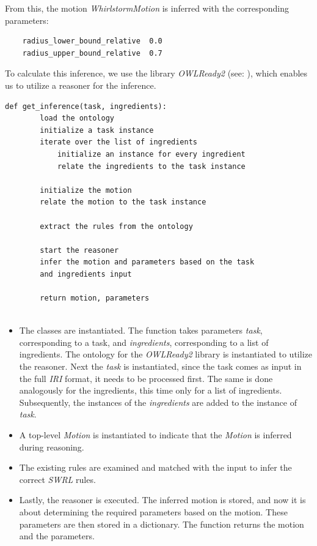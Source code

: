 From this, the motion \textit{WhirlstormMotion} is inferred with the corresponding parameters:
\begin{lstlisting}
    radius_lower_bound_relative  0.0
    radius_upper_bound_relative  0.7
\end{lstlisting}
To calculate this inference, we use the library \textit{OWLReady2} (see: ), which enables us to utilize a reasoner for the inference.

\begin{lstlisting}[caption={Inference},captionpos=b]
    def get_inference(task, ingredients):
        load the ontology
        initialize a task instance
        iterate over the list of ingredients
            initialize an instance for every ingredient
            relate the ingredients to the task instance
        
        initialize the motion
        relate the motion to the task instance

        extract the rules from the ontology

        start the reasoner
        infer the motion and parameters based on the task 
        and ingredients input

        return motion, parameters


\end{lstlisting}
\begin{itemize}
    \item The classes are instantiated. The function takes parameters \textit{task}, corresponding to a task, and \textit{ingredients}, corresponding to a list of ingredients. The ontology for the \textit{OWLReady2} library is instantiated to utilize the reasoner. Next the \textit{task} is instantiated, since the task comes as input in the full \textit{IRI} format, it needs to be processed first. The same is done analogously for the ingredients, this time only for a list of ingredients. Subsequently, the instances of the \textit{ingredients} are added to the instance of \textit{task}.
    \item A top-level \textit{Motion} is instantiated to indicate that the \textit{Motion} is inferred during reasoning.
    \item The existing rules are examined and matched with the input to infer the correct \textit{SWRL} rules.
    \item Lastly, the reasoner is executed. The inferred motion is stored, and now it is about determining the required parameters based on the motion. These parameters are then stored in a dictionary. The function returns the motion and the parameters.
\end{itemize}

